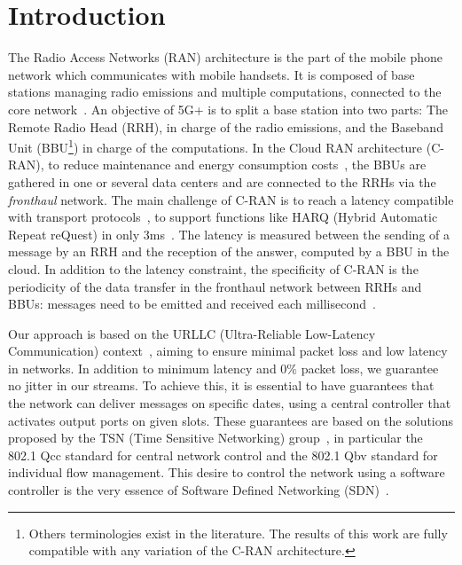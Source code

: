 \documentclass[pdflatex,sn-mathphys,iicol]{sn-jnl}%
\theoremstyle{thmstyleone}%
\theoremstyle{thmstyletwo}%
\theoremstyle{thmstylethree}%
\begin{document}
\section{Introduction}

The Radio Access Networks (RAN) architecture is the part of the mobile phone network which communicates with mobile handsets. It is composed of base stations managing radio emissions and multiple computations, connected to the core network~\cite{hossain2019recent}. 
An objective of 5G+ is to split a base station into two parts: The Remote Radio Head (RRH), in charge of the radio emissions, and the Baseband Unit (BBU\footnote{Others terminologies exist in the literature. The results of this work are fully compatible with any variation of the C-RAN architecture.}) in charge of the computations. In the Cloud RAN architecture (C-RAN), to reduce maintenance and energy consumption costs~\cite{gavrilovska2020cloud,mobile2011c,checko2014cloud}, the BBUs are gathered in one or several data centers and are connected to the RRHs via the \emph{fronthaul} network.
 The main challenge of C-RAN is to reach a latency compatible with transport protocols~\cite{ieeep802}, to support functions like  HARQ (Hybrid Automatic Repeat reQuest) in only $3$ms~\cite{bouguen2012lte}. The latency is measured between the sending of a message by an RRH and the reception of the answer, computed by a BBU in the cloud. In addition to the latency constraint, the specificity of C-RAN is the periodicity of the data transfer in the fronthaul network between RRHs and BBUs: messages need to be emitted and received each millisecond~\cite{dogra2020survey,3gpp5g,romano2019imt}.

Our approach is based on the URLLC (Ultra-Reliable Low-Latency Communication) context~\cite{siddiqui2023urllc}, aiming to ensure minimal packet loss and low latency in networks. In addition to minimum latency and $0\%$ packet loss, we guarantee no jitter in our streams. To achieve this, it is essential to have guarantees that the network can deliver messages on specific dates, using a central controller that activates output ports on given slots. These guarantees are based on the solutions proposed by the TSN (Time Sensitive Networking) group~\cite{ieee802}, in particular the 802.1 Qcc standard for central network control and the 802.1 Qbv standard for individual flow management. This desire to control the network using a software controller is the very essence of Software Defined Networking (SDN)~\cite{waseem2022software}.
\end{document}
